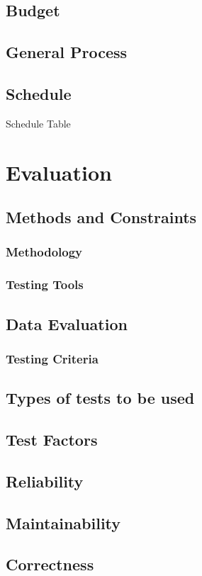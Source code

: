\documentclass{article}
\begin{document}
\subsection{Budget}
\subsection{General Process}
\subsection{Schedule}
Schedule Table

\section{Evaluation}
\subsection{Methods and Constraints}
\subsubsection{Methodology}
\subsubsection{Testing Tools}
\subsection{Data Evaluation}
\subsubsection{Testing Criteria}
\subsection{Types of tests to be used}
\subsection{Test Factors}
\subsection{Reliability}
\subsection{Maintainability}
\subsection{Correctness} 
\end{document}
